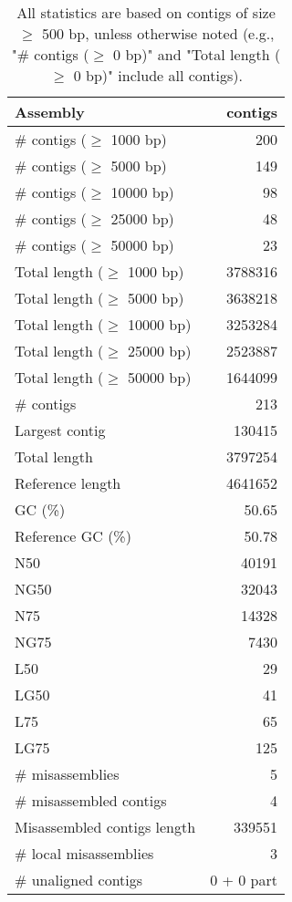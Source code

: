 \documentclass[12pt,a4paper]{article}
\begin{document}
\begin{table}[ht]
\begin{center}
\caption{All statistics are based on contigs of size $\geq$ 500 bp, unless otherwise noted (e.g., "\# contigs ($\geq$ 0 bp)" and "Total length ($\geq$ 0 bp)" include all contigs).}
\begin{tabular}{|l*{1}{|r}|}
\hline
Assembly & contigs \\ \hline
\# contigs ($\geq$ 1000 bp) & 200 \\ \hline
\# contigs ($\geq$ 5000 bp) & 149 \\ \hline
\# contigs ($\geq$ 10000 bp) & 98 \\ \hline
\# contigs ($\geq$ 25000 bp) & 48 \\ \hline
\# contigs ($\geq$ 50000 bp) & 23 \\ \hline
Total length ($\geq$ 1000 bp) & 3788316 \\ \hline
Total length ($\geq$ 5000 bp) & 3638218 \\ \hline
Total length ($\geq$ 10000 bp) & 3253284 \\ \hline
Total length ($\geq$ 25000 bp) & 2523887 \\ \hline
Total length ($\geq$ 50000 bp) & 1644099 \\ \hline
\# contigs & 213 \\ \hline
Largest contig & 130415 \\ \hline
Total length & 3797254 \\ \hline
Reference length & 4641652 \\ \hline
GC (\%) & 50.65 \\ \hline
Reference GC (\%) & 50.78 \\ \hline
N50 & 40191 \\ \hline
NG50 & 32043 \\ \hline
N75 & 14328 \\ \hline
NG75 & 7430 \\ \hline
L50 & 29 \\ \hline
LG50 & 41 \\ \hline
L75 & 65 \\ \hline
LG75 & 125 \\ \hline
\# misassemblies & 5 \\ \hline
\# misassembled contigs & 4 \\ \hline
Misassembled contigs length & 339551 \\ \hline
\# local misassemblies & 3 \\ \hline
\# unaligned contigs & 0 + 0 part \\ \hline

\end{tabular}
\end{center}
\end{table}
\end{document}
